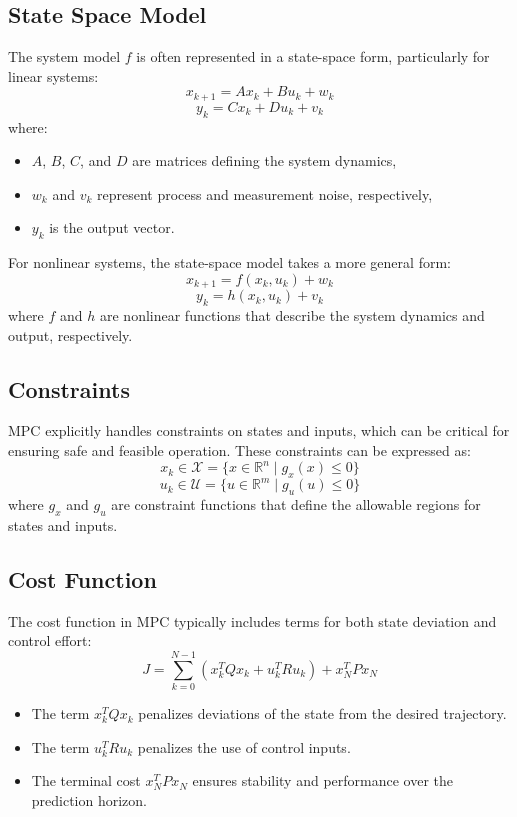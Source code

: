 \subsection*{State Space Model}
The system model \(f\) is often represented in a state-space form, particularly for linear systems:
\[
x_{k+1} = A x_k + B u_k + w_k
\]
\[
y_k = C x_k + D u_k + v_k
\]
where:
\begin{itemize}
	\item \(A\), \(B\), \(C\), and \(D\) are matrices defining the system dynamics,
	\item \(w_k\) and \(v_k\) represent process and measurement noise, respectively,
	\item \(y_k\) is the output vector.
\end{itemize}

For nonlinear systems, the state-space model takes a more general form:
\[
x_{k+1} = f(x_k, u_k) + w_k
\]
\[
y_k = h(x_k, u_k) + v_k
\]
where \(f\) and \(h\) are nonlinear functions that describe the system dynamics and output, respectively.

\subsection*{Constraints}
MPC explicitly handles constraints on states and inputs, which can be critical for ensuring safe and feasible operation. These constraints can be expressed as:
\[
x_k \in \mathcal{X} = \{x \in \mathbb{R}^n \mid g_x(x) \leq 0\}
\]
\[
u_k \in \mathcal{U} = \{u \in \mathbb{R}^m \mid g_u(u) \leq 0\}
\]
where \(g_x\) and \(g_u\) are constraint functions that define the allowable regions for states and inputs.

\subsection*{Cost Function}
The cost function in MPC typically includes terms for both state deviation and control effort:
\[
J = \sum_{k=0}^{N-1} \left( x_k^T Q x_k + u_k^T R u_k \right) + x_N^T P x_N
\]
\begin{itemize}
	\item The term \(x_k^T Q x_k\) penalizes deviations of the state from the desired trajectory.
	\item The term \(u_k^T R u_k\) penalizes the use of control inputs.
	\item The terminal cost \(x_N^T P x_N\) ensures stability and performance over the prediction horizon.
\end{itemize}

